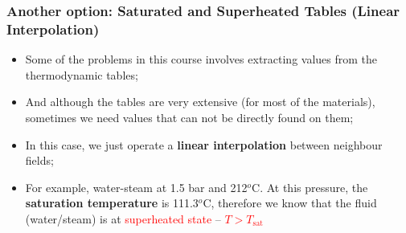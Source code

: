 \documentclass[10pt,compress]{beamer}
\begin{document}
\begin{frame}
  \frametitle{Another option: Saturated and Superheated Tables (Linear Interpolation)}
\noindent
\begin{itemize}
\item <2-> Some of the problems in this course involves extracting values from the thermodynamic tables;
\item <3-> And although the tables are very extensive (for most of the materials), sometimes we need values that can not be directly found on them;
\item <4-> In this case, we just operate a {\bf linear interpolation} between neighbour fields;
\item <5-> For example, water-steam at 1.5 bar and 212$^{o}$C. At this pressure, the {\bf saturation temperature} is 111.3$^{o}$C, therefore we know that the fluid (water/steam) is at \textcolor{red}{superheated state} -- \textcolor{red}{$T > T_{\text{sat}}$}
\end{itemize}

\end{frame}

\end{document}
